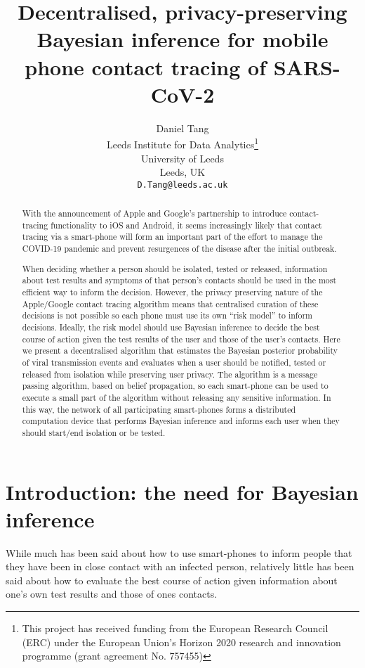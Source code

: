 \documentclass{article}
\title{Decentralised, privacy-preserving Bayesian inference for mobile phone contact tracing of SARS-CoV-2}
\author{
  Daniel Tang\\
  Leeds Institute for Data Analytics\thanks{This project has received funding from the European Research Council (ERC) under the European Union’s Horizon 2020 research and innovation programme (grant agreement No. 757455)}\\
  University of Leeds\\
  Leeds, UK\\
  \texttt{D.Tang@leeds.ac.uk} \\
}
\begin{document}
\maketitle

\begin{abstract}
With the announcement of Apple and Google's partnership to introduce contact-tracing functionality to iOS and Android, it seems increasingly likely that contact tracing via a smart-phone will form an important part of the effort to manage the COVID-19 pandemic and prevent resurgences of the disease after the initial outbreak.

When deciding whether a person should be isolated, tested or released, information about test results and symptoms of that person's contacts should be used in the most efficient way to inform the decision. However, the privacy preserving nature of the Apple/Google contact tracing algorithm means that centralised curation of these decisions is not possible so each phone must use its own ``risk model'' to inform decisions. Ideally, the risk model should use Bayesian inference to decide the best course of action given the test results of the user and those of the user's contacts. Here we present a decentralised algorithm that estimates the Bayesian posterior probability of viral transmission events and evaluates when a user should be notified, tested or released from isolation while preserving user privacy. The algorithm is a message passing algorithm, based on belief propagation, so each smart-phone can be used to execute a small part of the algorithm without releasing any sensitive information. In this way, the network of all participating smart-phones forms a distributed computation device that performs Bayesian inference and informs each user when they should start/end isolation or be tested. 

\end{abstract}


\section{Introduction: the need for Bayesian inference}

While much has been said about how to use smart-phones to inform people that they have been in close contact with an infected person\cite{dp3t}\cite{applegoogle}\cite{pepppt}, relatively little has been said about how to evaluate the best course of action given information about one's own test results and those of ones contacts.
\end{document}
